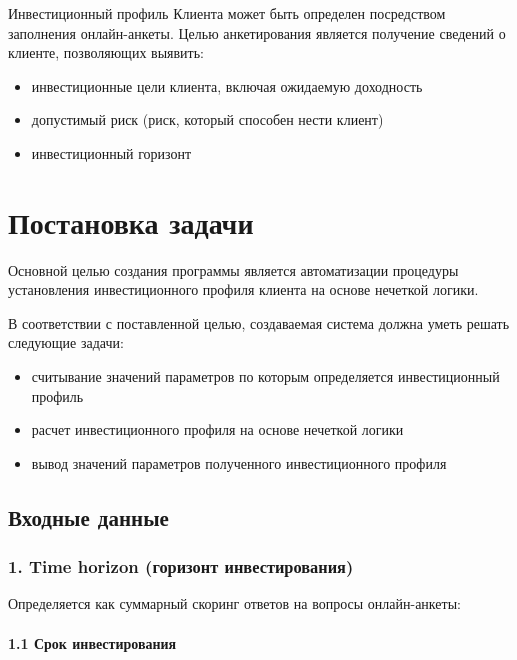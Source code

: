 \documentclass[11pt]{article}
\providecommand{\tightlist}{%
      \setlength{\itemsep}{0pt}\setlength{\parskip}{0pt}}
\begin{document}
Инвестиционный профиль Клиента может быть определен посредством
заполнения онлайн-анкеты. Целью анкетирования является получение
сведений о клиенте, позволяющих выявить:

\begin{itemize}
\tightlist
\item
  инвестиционные цели клиента, включая ожидаемую доходность
\item
  допустимый риск (риск, который способен нести клиент)
\item
  инвестиционный горизонт
\end{itemize}

\section{Постановка
задачи}\label{ux43fux43eux441ux442ux430ux43dux43eux432ux43aux430-ux437ux430ux434ux430ux447ux438}

Основной целью создания программы является автоматизации процедуры
установления инвестиционного профиля клиента на основе нечеткой логики.

В соответствии с поставленной целью, создаваемая система должна уметь
решать следующие задачи:

\begin{itemize}
\tightlist
\item
  считывание значений параметров по которым определяется инвестиционный
  профиль
\item
  расчет инвестиционного профиля на основе нечеткой логики
\item
  вывод значений параметров полученного инвестиционного профиля
\end{itemize}

\subsection{Входные
данные}\label{ux432ux445ux43eux434ux43dux44bux435-ux434ux430ux43dux43dux44bux435}

\subsubsection{1. Time horizon (горизонт
инвестирования)}\label{time-horizon-ux433ux43eux440ux438ux437ux43eux43dux442-ux438ux43dux432ux435ux441ux442ux438ux440ux43eux432ux430ux43dux438ux44f}

Определяется как суммарный скоринг ответов на вопросы онлайн-анкеты:

\paragraph{1.1 Срок
инвестирования}\label{ux441ux440ux43eux43a-ux438ux43dux432ux435ux441ux442ux438ux440ux43eux432ux430ux43dux438ux44f}
\end{document}
